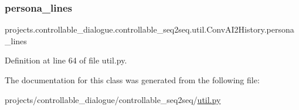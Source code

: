 \subsubsection{\texorpdfstring{persona\+\_\+lines}{persona\_lines}}
{\footnotesize\ttfamily projects.\+controllable\+\_\+dialogue.\+controllable\+\_\+seq2seq.\+util.\+Conv\+A\+I2\+History.\+persona\+\_\+lines}



Definition at line 64 of file util.\+py.



The documentation for this class was generated from the following file\+:\begin{DoxyCompactItemize}
\item 
projects/controllable\+\_\+dialogue/controllable\+\_\+seq2seq/\hyperlink{util_8py}{util.\+py}\end{DoxyCompactItemize}
